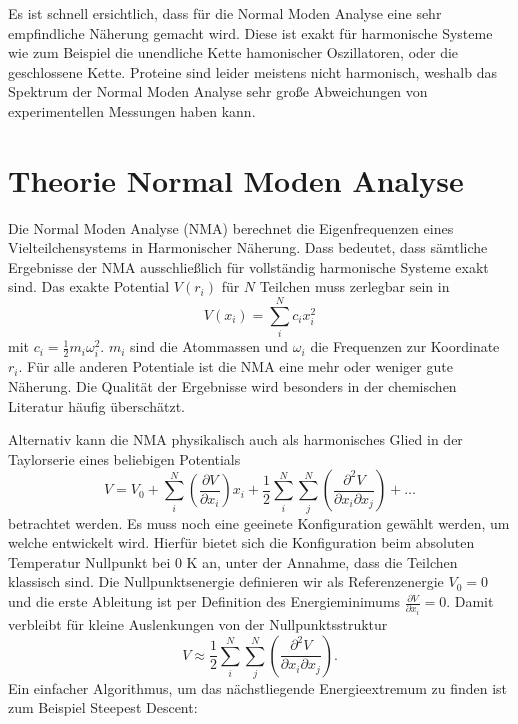 \documentclass[a4paper,12pt]{article}
\begin{document}
Es ist schnell ersichtlich, dass für die Normal Moden Analyse eine sehr empfindliche Näherung gemacht wird. Diese ist exakt für harmonische Systeme
wie zum Beispiel die unendliche Kette hamonischer Oszillatoren, oder die geschlossene Kette. Proteine sind leider meistens nicht harmonisch, weshalb
das Spektrum der Normal Moden Analyse sehr große Abweichungen von experimentellen Messungen haben kann.



\section{Theorie Normal Moden Analyse}\label{nmasection}
Die Normal Moden Analyse (NMA) berechnet die Eigenfrequenzen eines Vielteilchensystems in Harmonischer Näherung. Dass bedeutet, dass sämtliche 
Ergebnisse der NMA ausschließlich für vollständig harmonische Systeme exakt sind. Das exakte Potential $V(r_i)$ für $N$ Teilchen muss zerlegbar 
sein in
\begin{equation}
 V(x_i)=\sum_i^N c_i x_i^2
\end{equation}
mit $c_i=\frac{1}{2}m_i \omega_i^2$. $m_i$ sind die Atommassen und $\omega_i$ die Frequenzen zur Koordinate $r_i$. Für alle anderen Potentiale ist 
die NMA eine mehr oder weniger gute Näherung. Die Qualität der Ergebnisse wird besonders in der chemischen Literatur häufig überschätzt.

Alternativ kann die NMA physikalisch auch als harmonisches Glied in der Taylorserie eines beliebigen Potentials 
\begin{equation}
 V=V_0+\sum_i^N \left( \frac{\partial V}{\partial x_i} \right) x_i + \frac{1}{2} \sum_i^N \sum_j^N \left( \frac{\partial^2 V}{\partial x_i \partial x_j} \right) + \ldots
\end{equation}
betrachtet werden. Es muss noch eine geeinete Konfiguration gewählt werden, um welche entwickelt wird. Hierfür bietet sich die Konfiguration beim absoluten Temperatur Nullpunkt
bei 0 K an, unter der Annahme, dass die Teilchen klassisch sind. Die Nullpunktsenergie definieren wir als Referenzenergie $V_0=0$ und die erste Ableitung ist per Definition 
des Energieminimums $\frac{\partial V}{\partial x_i}=0$. Damit verbleibt für kleine Auslenkungen von der Nullpunktsstruktur
\begin{equation}
 V\approx\frac{1}{2} \sum_i^N \sum_j^N \left( \frac{\partial^2 V}{\partial x_i \partial x_j} \right).
\end{equation}
Ein einfacher Algorithmus, um das nächstliegende Energieextremum zu finden ist zum Beispiel Steepest Descent:
\end{document}
